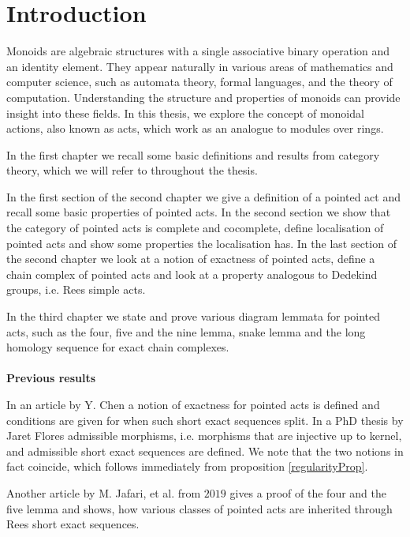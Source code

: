 \chapter*{Introduction}

Monoids are algebraic structures with a single associative binary operation and an identity element. 
They appear naturally in various areas of mathematics and computer science, such as automata theory, formal languages, and the theory of computation. 
Understanding the structure and properties of monoids can provide insight into these fields.
In this thesis, we explore the concept of monoidal actions, also known as acts, which work as an analogue to modules over rings.\par 

In the first chapter we recall some basic definitions and results from category theory, which we will refer to throughout the thesis.\par  
In the first section of the second chapter we give a definition of a pointed act and recall some basic properties of pointed acts. In the second section we show that the category of pointed acts is complete and 
cocomplete, define localisation of pointed acts and show some properties the localisation has. In the last section of the second chapter we look at a 
notion of exactness of pointed acts, define a chain complex of pointed acts and look at a property analogous to Dedekind groups, i.e. Rees simple acts.\par 
In the third chapter we state and prove various diagram lemmata for pointed acts, such as the four, five and the nine lemma, snake lemma and the long homology sequence for
exact chain complexes.\\ \\
\textbf{Previous results}\par 
    In an article by Y. Chen \cite{Chen02} a notion of exactness for pointed acts is defined and conditions are given for when such 
    short exact sequences split. In a PhD thesis by Jaret Flores \cite{Flores15} admissible morphisms, i.e. morphisms that are injective up to kernel,
    and admissible short exact sequences are defined. We note that the two notions in fact coincide, which follows immediately from proposition \ref{regularityProp}.\par 
    Another article by M. Jafari, et al. \cite{Jafari19} from $2019$ gives a proof of the four and the five lemma and shows, how various classes of 
    pointed acts are inherited through Rees short exact sequences.